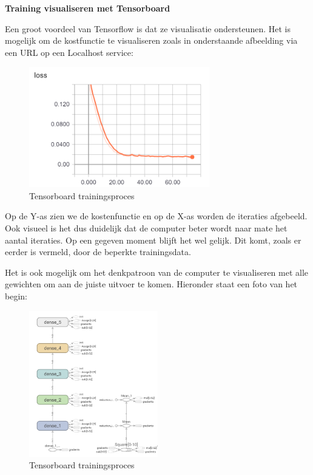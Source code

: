 \textbf{Training visualiseren met Tensorboard}

Een groot voordeel van Tensorflow is dat ze visualisatie ondersteunen. Het is mogelijk om de kostfunctie te visualiseren zoals in onderstaande afbeelding via een URL op een Localhost service:

\vspace{2em}
\begin{figure}[h!]
\centering
\includegraphics[width=0.7\textwidth]{bachproef/img/training_tensor.png}
\caption{Tensorboard trainingsproces}
\end{figure}

Op de Y-as zien we de kostenfunctie en op de X-as worden de iteraties afgebeeld. Ook visueel is het dus duidelijk dat de computer beter wordt naar mate het aantal iteraties. Op een gegeven moment blijft het wel gelijk. Dit komt, zoals er eerder is vermeld, door de beperkte trainingsdata.

Het is ook mogelijk om het denkpatroon van de computer te visualiseren met alle gewichten om aan de juiste uitvoer te komen. Hieronder staat een foto van het begin:

\begin{figure}[h!]
\centering
\includegraphics[width=0.5\textwidth]{bachproef/img/tensorboard.png}
\caption{Tensorboard trainingsproces}
\end{figure}
